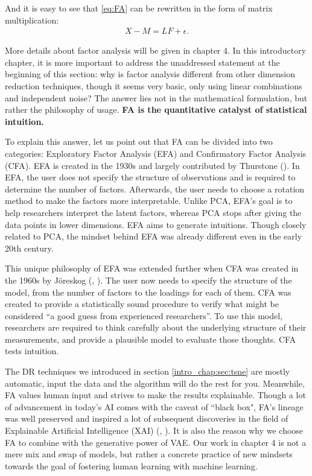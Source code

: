And it is easy to see that \eqref{eq:FA} can be rewritten in the form of matrix
multiplication:
\begin{align}
    X - M = LF + \epsilon.
\end{align}

More details about factor analysis will be given in chapter 4. In this
introductory chapter, it is more important to address the unaddressed statement
at the beginning of this section: why is factor analysis different from other
dimension reduction techniques, though it seems very basic, only using linear
combinations and independent noise? The answer lies not in the mathematical
formulation, but rather the philosophy of usage. \textbf{FA is the quantitative
    catalyst of statistical intuition.}

To explain this answer, let us point out that FA can be divided into two
categories: Exploratory Factor Analysis (EFA) and Confirmatory Factor Analysis
(CFA). EFA is created in the 1930s and largely contributed by Thurstone
(\cite{thurstone1947multiple}). In EFA, the user does not specify the structure
of observations and is required to determine the number of factors. Afterwards,
the user needs to choose a rotation method to make the factors more
interpretable. Unlike PCA, EFA's goal is to help researchers interpret the
latent factors, whereas PCA stops after giving the data points in lower
dimensions. EFA aims to generate intuitions. Though closely related to PCA, the
mindset behind EFA was already different even in the early 20th century.

This unique philosophy of EFA was extended further when CFA was created in
the 1960s by Jöreskog (\cite{Jöreskog_1967}, \cite{Jöreskog_1969}). The user now
needs to specify the structure of the model, from the number of factors to the
loadings for each of them. CFA was created to provide a statistically sound
procedure to verify what might be considered ``a good guess from experienced
researchers''. To use this model, researchers are required to think carefully
about the underlying structure of their measurements, and provide a plausible
model to evaluate those thoughts. CFA tests intuition.

The DR techniques we introduced in section \ref{intro_chap:sec:tsne} are mostly
automatic, input the data and the algorithm will do the rest for you.
Meanwhile, FA values human input and strives to make the results explainable.
Though a lot of advancement in today's AI comes with the caveat of ``black
box", FA's lineage was well preserved and inspired a lot of subsequent
discoveries in the field of Explainable Artificial Intelligence (XAI)
(\cite{doshivelez2017}, \cite{miller2018}). It is also the reason why we choose
FA to combine with the generative power of VAE. Our work in chapter 4 is not a
mere mix and swap of models, but rather a concrete practice of new mindsets
towards the goal of fostering human learning with machine learning.

